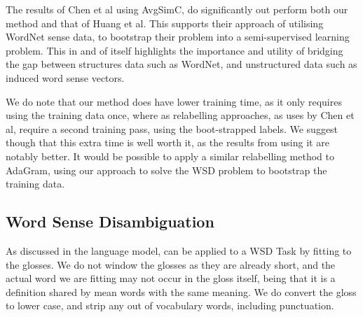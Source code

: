 \documentclass{sig-alternate}
\begin{document}
\begin{comment}
We suggest that RefittedSim with geometric smoothing, is a more appropriate method that AvgSimC when working with probabilities directly taken from a word sense language model such as AdaGram or the Greedy embeddings we defined as a baseline.
The methods presented by Reisinger and Mooney, Huang et al. and Iacobacci et al., do not work with sense probabilities taken from a language model; rather their methods use a distance measure to approximate fuzzy membership of cluster or a degree of relatedness to the sense vector \parencite{Reisinger2010,Huang2012,iacobacci2015sensembed}. The distance measure itself imposes a particular curve onto the distribution of distances i.e. onto the assumed probabilities used in AvgSimC; and this particular distribution, solves the data sparsity problem that we solve with geometric smoothing.
The method presented by Chen et al. is significantly different, in that it has the predicted sense of the context words as an output (rather than an input) of it's model, and so has a different distribution from either of our methods, or from the  distance methods discussed. Further, it re-label it's training data and then fine tunes it's sense embeddings.
\end{comment}


The results of Chen et al using AvgSimC, do significantly out perform both our method and that of Huang et al. This supports their approach of utilising WordNet sense data, to bootstrap their problem into a semi-supervised learning problem. This in and of itself highlights the importance and utility of bridging the gap between structures data such as WordNet, and unstructured data such as induced word sense vectors.


We do note that our method does have lower training time, as it only requires using the training data once, where as relabelling approaches, as uses by Chen et al, require a second training pass, using the boot-strapped labels. We suggest though that this extra time is well worth it, as the results from using it are notably better. It would be possible to apply a similar relabelling method to AdaGram, using our approach to solve the WSD problem to bootstrap the training data.

\subsection{Word Sense Disambiguation}

As discussed in  the language model, can be applied to a WSD Task by fitting to the glosses. We do not window the glosses as they are already short, and the actual word we are fitting may not occur in the gloss itself, being that it is a definition shared by mean words with the same meaning. We do convert the gloss to lower case, and strip any out of vocabulary words, including punctuation.
\end{document}
